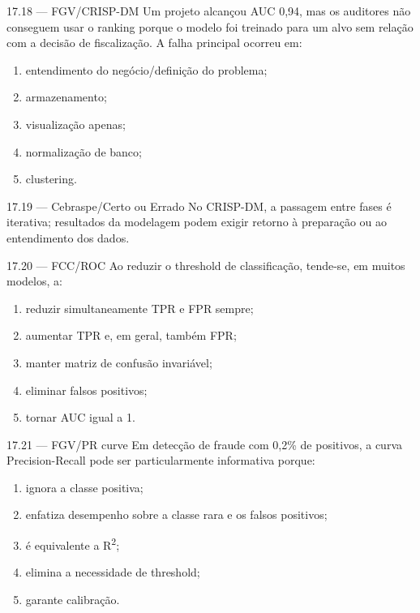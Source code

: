 \begin{questao}{ 17.18 — FGV/CRISP-DM}
Um projeto alcançou AUC 0,94, mas os auditores não conseguem usar o ranking porque o modelo foi treinado para um alvo sem relação com a decisão de fiscalização. A falha principal ocorreu em:
\begin{enumerate}[label=\Alph*)]
\item entendimento do negócio/definição do problema;
\item armazenamento;
\item visualização apenas;
\item normalização de banco;
\item clustering.
\end{enumerate}
\end{questao}

\begin{questao}{ 17.19 — Cebraspe/Certo ou Errado}
No CRISP-DM, a passagem entre fases é iterativa; resultados da modelagem podem exigir retorno à preparação ou ao entendimento dos dados.
\end{questao}

\begin{questao}{ 17.20 — FCC/ROC}
Ao reduzir o threshold de classificação, tende-se, em muitos modelos, a:
\begin{enumerate}[label=\Alph*)]
\item reduzir simultaneamente TPR e FPR sempre;
\item aumentar TPR e, em geral, também FPR;
\item manter matriz de confusão invariável;
\item eliminar falsos positivos;
\item tornar AUC igual a 1.
\end{enumerate}
\end{questao}

\begin{questao}{ 17.21 — FGV/PR curve}
Em detecção de fraude com 0,2\% de positivos, a curva Precision-Recall pode ser particularmente informativa porque:
\begin{enumerate}[label=\Alph*)]
\item ignora a classe positiva;
\item enfatiza desempenho sobre a classe rara e os falsos positivos;
\item é equivalente a R\textsuperscript{2};
\item elimina a necessidade de threshold;
\item garante calibração.
\end{enumerate}
\end{questao}

